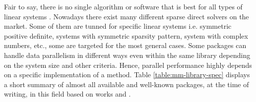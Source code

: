 \label{subseq:mm-library-choice}



Fair to say, there is no single algorithm or software that is best for all types of linear systems \cite{list-of-sparse-direct-solvers}. Nowadays there exist many different sparse direct solvers on the market. Some of them are tunned for specific linear systems i.e. symmetric positive definite, systems with symmetric sparsity pattern, system with complex numbers, etc., some are targeted for the most general cases. Some packages can handle data parallelism in different ways even within the same library depending on the system size and other criteria. Hence, parallel performance highly depends on a specific implementation of a method. Table \ref{table:mm-library-spec} displays a short summary of almost all available and well-known packages, at the time of writing, in this field based on works \cite{list-of-sparse-direct-solvers} and \cite{petsc-web-page}.\\




